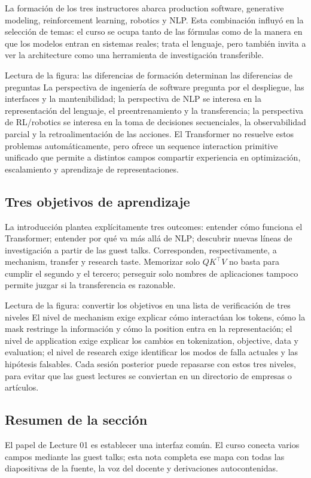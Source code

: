 La formación de los tres instructores abarca production software, generative modeling, reinforcement learning, robotics y NLP. Esta combinación influyó en la selección de temas: el curso se ocupa tanto de las fórmulas como de la manera en que los modelos entran en sistemas reales; trata el lenguaje, pero también invita a ver la architecture como una herramienta de investigación transferible.


\begin{knowledgebox}{Lectura de la figura: las diferencias de formación determinan las diferencias de preguntas}
La perspectiva de ingeniería de software pregunta por el despliegue, las interfaces y la mantenibilidad; la perspectiva de NLP se interesa en la representación del lenguaje, el preentrenamiento y la transferencia; la perspectiva de RL/robotics se interesa en la toma de decisiones secuenciales, la observabilidad parcial y la retroalimentación de las acciones. El Transformer no resuelve estos problemas automáticamente, pero ofrece un sequence interaction primitive unificado que permite a distintos campos compartir experiencia en optimización, escalamiento y aprendizaje de representaciones.
\end{knowledgebox}

\subsection{Tres objetivos de aprendizaje}

La introducción plantea explícitamente tres outcomes: entender cómo funciona el Transformer; entender por qué va más allá de NLP; descubrir nuevas líneas de investigación a partir de las guest talks. Corresponden, respectivamente, a mechanism, transfer y research taste. Memorizar solo $QK^\top V$ no basta para cumplir el segundo y el tercero; perseguir solo nombres de aplicaciones tampoco permite juzgar si la transferencia es razonable.


\begin{knowledgebox}{Lectura de la figura: convertir los objetivos en una lista de verificación de tres niveles}
El nivel de mechanism exige explicar cómo interactúan los tokens, cómo la mask restringe la información y cómo la position entra en la representación; el nivel de application exige explicar los cambios en tokenization, objective, data y evaluation; el nivel de research exige identificar los modos de falla actuales y las hipótesis falsables. Cada sesión posterior puede repasarse con estos tres niveles, para evitar que las guest lectures se conviertan en un directorio de empresas o artículos.
\end{knowledgebox}

\subsection{Resumen de la sección}

El papel de Lecture 01 es establecer una interfaz común. El curso conecta varios campos mediante las guest talks; esta nota completa ese mapa con todas las diapositivas de la fuente, la voz del docente y derivaciones autocontenidas.
